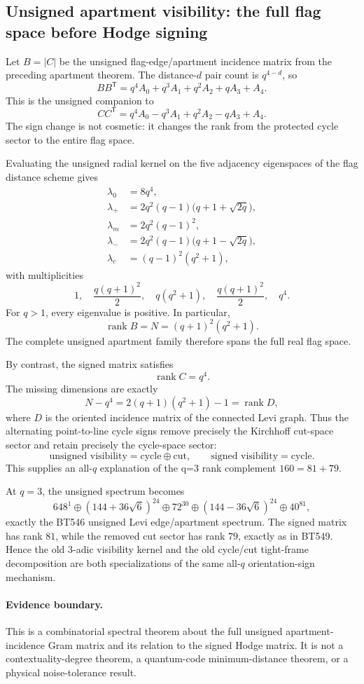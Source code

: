 \subsection{Unsigned apartment visibility: the full flag space before Hodge signing}

Let \(B=|C|\) be the unsigned flag-edge/apartment incidence matrix from the preceding
apartment theorem.  The distance-\(d\) pair count is \(q^{4-d}\), so
\[
\boxed{
BB^{\mathsf T}=q^4A_0+q^3A_1+q^2A_2+qA_3+A_4.
}
\]
This is the unsigned companion to
\[
CC^{\mathsf T}=q^4A_0-q^3A_1+q^2A_2-qA_3+A_4.
\]
The sign change is not cosmetic: it changes the rank from the protected cycle sector to the
entire flag space.

Evaluating the unsigned radial kernel on the five adjacency eigenspaces of the flag distance
scheme gives
\[
\boxed{
\begin{aligned}
\lambda_0&=8q^4,\\
\lambda_+&=2q^2(q-1)\bigl(q+1+\sqrt{2q}\bigr),\\
\lambda_m&=2q^2(q-1)^2,\\
\lambda_-&=2q^2(q-1)\bigl(q+1-\sqrt{2q}\bigr),\\
\lambda_c&=(q-1)^2(q^2+1),
\end{aligned}}
\]
with multiplicities
\[
\boxed{
1,\quad \frac{q(q+1)^2}{2},\quad q(q^2+1),\quad
\frac{q(q+1)^2}{2},\quad q^4.
}
\]
For \(q>1\), every eigenvalue is positive.  In particular,
\[
\boxed{\operatorname{rank}B=N=(q+1)^2(q^2+1).}
\]
The complete unsigned apartment family therefore spans the full real flag space.

By contrast, the signed matrix satisfies
\[
\operatorname{rank}C=q^4.
\]
The missing dimensions are exactly
\[
\boxed{
N-q^4
=2(q+1)(q^2+1)-1
=\operatorname{rank}D,
}
\]
where \(D\) is the oriented incidence matrix of the connected Levi graph.  Thus the
alternating point-to-line cycle signs remove precisely the Kirchhoff cut-space sector and
retain precisely the cycle-space sector:
\[
\boxed{
\text{unsigned visibility}=\text{cycle}\oplus\text{cut},
\qquad
\text{signed visibility}=\text{cycle}.
}
\]
This supplies an all-\(q\) explanation of the q=3 rank complement \(160=81+79\).

At \(q=3\), the unsigned spectrum becomes
\[
\boxed{
648^1
\oplus(144+36\sqrt6)^{24}
\oplus72^{30}
\oplus(144-36\sqrt6)^{24}
\oplus40^{81},
}
\]
exactly the BT546 unsigned Levi edge/apartment spectrum.  The signed matrix has rank \(81\),
while the removed cut sector has rank \(79\), exactly as in BT549.  Hence the old 3-adic
visibility kernel and the old cycle/cut tight-frame decomposition are both specializations of
the same all-\(q\) orientation-sign mechanism.

\paragraph{Evidence boundary.}
This is a combinatorial spectral theorem about the full unsigned apartment-incidence Gram
matrix and its relation to the signed Hodge matrix.  It is not a contextuality-degree theorem,
a quantum-code minimum-distance theorem, or a physical noise-tolerance result.
